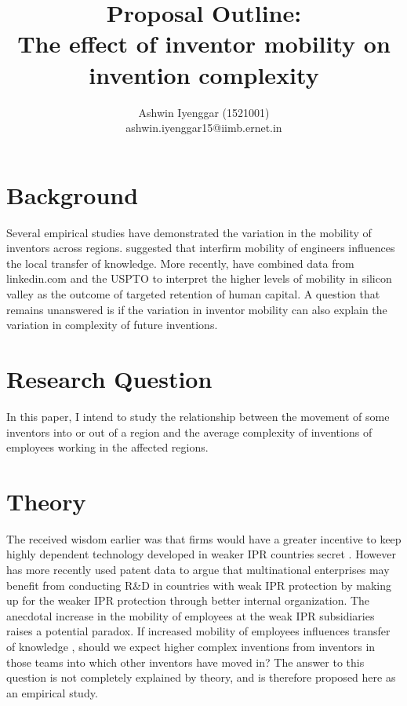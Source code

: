 \documentclass[12pt]{article}
\begin{document}
\title{Proposal Outline:\\The effect of inventor mobility on  invention complexity}
\author{Ashwin Iyenggar  (1521001) \\ ashwin.iyenggar15@iimb.ernet.in} 


\maketitle
\thispagestyle{empty}
\section{Background}
Several empirical studies have demonstrated the variation in the mobility of inventors across regions. \cite{Almeida1999} suggested that interfirm mobility of engineers influences the local transfer of knowledge.  More recently, \cite{Ge2016} have combined data from linkedin.com and the USPTO to interpret the higher levels of mobility in silicon valley as the outcome of targeted retention of human capital. A question that remains unanswered is if the variation in inventor mobility can also explain the variation in complexity of future inventions.

\section{Research Question}
In this paper, I intend to study the relationship between the movement of some inventors into or out of a region and the average complexity of inventions of employees working in the affected regions. 

\section{Theory}
The received wisdom earlier was that firms would have a greater incentive to keep  highly dependent technology developed in weaker IPR countries secret \citep{Cohen2000}. However  \cite{Zhao2006} has more recently used patent data to argue  that multinational enterprises may benefit from conducting R\&D in countries with weak IPR protection by  making up for the weaker IPR protection through better internal organization. The anecdotal increase in the mobility of employees at the weak IPR subsidiaries raises a potential paradox. If increased mobility of employees influences transfer of knowledge \citep{Almeida1999}, should we expect higher complex inventions from inventors in those teams into which other inventors have moved in? The answer to this question is not completely explained by theory, and is therefore proposed here as an empirical study.
\end{document}
